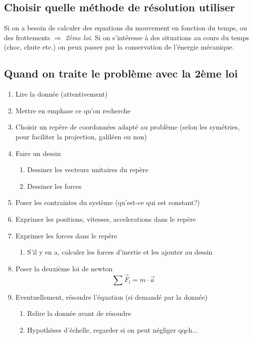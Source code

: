 
\begin{multicols}{2}
    \subsection{Choisir quelle méthode de résolution utiliser}
    Si on a besoin de calculer des equations du mouvement en fonction du temps, ou des frottements $\Rightarrow$ \textit{2ème loi}. Si on s'intéresse à des situations au cours du temps (choc, chute etc.) on peux passer par la conservation de l'énergie mécanique.
    \subsection{Quand on traite le problème avec la 2ème loi}
    \begin{enumerate}
        \item Lire la donnée (attentivement)
        \item Mettre en emphase ce qu'on recherche
        \item Choisir un repère de coordonnées adapté au problème (selon les symétries, pour faciliter la projection, galiléen   ou non)
        \item Faire un dessin
        \begin{enumerate}
            \item Dessiner les vecteurs unitaires du repère
            \item Dessiner les forces
        \end{enumerate}
        \item Poser les contraintes du système (qu'est-ce qui est constant?)
        \item Exprimer les positions, vitesses, accelerations dans le repère
        \item Exprimer les forces dans le repère
        \begin{enumerate}
            \item S'il y en a, calculer les forces d'inertie et les ajouter au dessin
        \end{enumerate}
        \item Poser la deuxième loi de newton 
        \[\sum \vec{F}_\text{i} = m \cdot \vec{a}\]
        \item Eventuellement, résoudre l'équation (si demandé par la donnée)
        \begin{enumerate}
            \item Relire la donnée avant de résoudre
            \item Hypothèses d'échelle, regarder si on peut négliger qqch...
        \end{enumerate}
    \end{enumerate}

\end{multicols}
